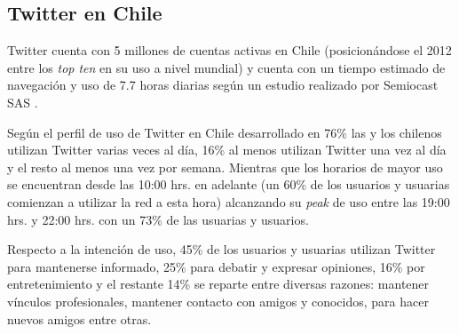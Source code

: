 \subsection{Twitter en Chile}

 Twitter cuenta con 5 millones de cuentas activas en Chile (posicionándose el 2012 entre los \emph{top ten} en su uso a nivel mundial) y cuenta con un tiempo estimado de navegación y uso de 7.7 horas diarias según un estudio realizado por Semiocast SAS \cite{rankingChileSemiocast}.

Según el perfil de uso de Twitter en Chile desarrollado en \cite{udpperfiluso} 76\% las y los chilenos utilizan Twitter varias veces al día, 16\% al menos utilizan Twitter una vez al día y el resto al menos una vez por semana. Mientras que los horarios de mayor uso se encuentran desde las 10:00 hrs. en adelante (un 60\% de los usuarios y usuarias comienzan a utilizar la red a esta hora) alcanzando su \emph{peak} de uso entre las 19:00 hrs. y 22:00 hrs. con un 73\% de las usuarias y usuarios.

Respecto a la intención de uso, 45\% de los usuarios y usuarias utilizan Twitter para mantenerse informado, 25\% para debatir y expresar opiniones, 16\% por entretenimiento y el restante 14\% se reparte entre diversas razones: mantener vínculos profesionales, mantener contacto con amigos y conocidos, para hacer nuevos amigos entre otras.